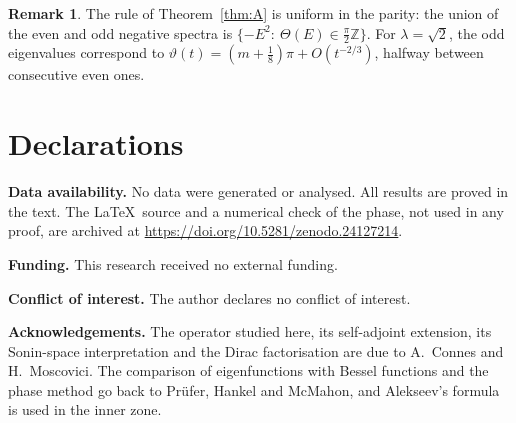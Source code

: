 \documentclass[11pt]{amsart}
\theoremstyle{definition}
\newtheorem{remark}[theorem]{Remark}
\newcommand{\ZZ}{\mathbb{Z}}
\begin{document}
\begin{remark}
The rule of Theorem~\ref{thm:A} is uniform in the parity: the union of the even and odd negative spectra is $\{-E^2:\ \Theta(E)\in\frac\pi2\ZZ\}$. For $\lambda=\sqrt2$, the odd eigenvalues correspond to $\vartheta(t)=(m+\frac18)\pi+O(t^{-2/3})$, halfway between consecutive even ones.
\end{remark}

\section*{Declarations}

\noindent\textbf{Data availability.} No data were generated or analysed. All results are proved in the text. The \LaTeX\ source and a numerical check of the phase, not used in any proof, are archived at \url{https://doi.org/10.5281/zenodo.24127214}.

\smallskip\noindent\textbf{Funding.} This research received no external funding.

\smallskip\noindent\textbf{Conflict of interest.} The author declares no conflict of interest.

\smallskip\noindent\textbf{Acknowledgements.} The operator studied here, its self-adjoint extension, its Sonin-space interpretation and the Dirac factorisation are due to A.~Connes and H.~Moscovici. The comparison of eigenfunctions with Bessel functions and the phase method go back to Pr\"ufer, Hankel and McMahon, and Alekseev's formula is used in the inner zone.
\end{document}
